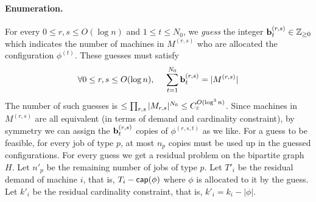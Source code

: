 \paragraph{Enumeration.} 
For every $0\leq r,s \leq O(\log n)$ and $1\le t\le N_0$, we {\em guess}  the  integer $\mathbf{b}^{(r,s)}_t \in {\mathbb Z}_{\geq 0}$ which indicates the number of machines in $M^{(r,s)}$ who are allocated the configuration $\phi^{(t)}$.
These guesses must satisfy 
\begin{equation}\label{eq:milp1}
\forall 0\leq r,s \leq O(\log n), ~~~~ \sum_{t=1}^{N_0} \mathbf{b}^{(r,s)}_t = |M^{(r,s)}|
\end{equation}
The number of such guesses is $\leq \prod_{r,s} |M_{r,s}|^{N_0} \leq C_\varepsilon^{O(\log^3 n)}$. 
Since machines in $M^{(r,s)}$ are all equivalent (in terms of demand and cardinality constraint), by symmetry we can assign the $\mathbf{b}^{(r,s)}_t$ copies of $\phi^(r,s,t)$ as we like.
For a guess to be feasible, for every job of type $p$, at most $n_p$ copies must be used up in the guessed configurations.
For every guess we get a residual problem on the bipartite graph $H$.
Let $n'_p$ be the remaining number of jobs of type $p$. 
Let $T'_i$ be the residual demand of machine $i$, that is, $T_i - \mathsf{cap}(\phi)$ where $\phi$ is allocated to it by the guess.
Let $k'_i$ be the residual cardinality constraint, that is, $k'_i = k_i - |\phi|$.
